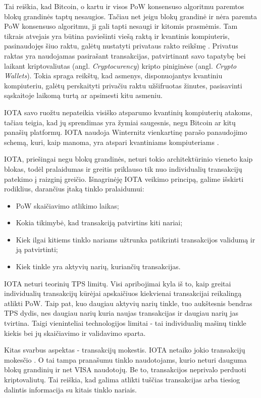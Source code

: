 Tai reiškia, kad Bitcoin, o kartu ir visos PoW konsensuso algoritmu paremtos blokų grandinės taptų nesaugios. Tačiau net jeigu blokų grandinė ir nėra paremta PoW konsensuso algoritmu, ji gali tapti nesaugi ir kitomis prasmėmis. Tam tikrais atvejais yra būtina paviešinti viešą raktą ir kvantinis kompiuteris, pasinaudojęs šiuo raktu, galėtų nustatyti privataus rakto reikšmę \cite{aggarwal2017quantum}. Privatus raktas yra naudojamas pasirašant transakcijas, patvirtinant savo tapatybę bei laikant kriptovaliutas (angl. \textit{Cryptocurency}) kripto piniginėse (angl. \textit{Crypto Wallets}). Tokia spraga reikštų, kad asmenys, disponuojantys kvantiniu kompiuteriu, galėtų perskaityti privačiu raktu užšifruotas žinutes, pasisavinti sąskaitoje laikomą turtą ar apsimesti kitu asmeniu.

IOTA savo ruožtu nepateikia visiško atsparumo kvantinių kompiuterių atakoms, tačiau teigia, kad jų sprendimas yra žymiai saugesnis, negu Bitcoin ar kitų panašių platformų. IOTA naudoja Winternitz vienkartinę parašo panaudojimo schemą, kuri, kaip manoma, yra atspari kvantiniams kompiuteriams \cite{el2018review}.

IOTA, priešingai negu blokų grandinės, neturi tokio architektūrinio vieneto kaip blokas, todėl pralaidumas ir greitis priklauso tik nuo individualių transakcijų patekimo į raizginį greičio. Išnagrinėję IOTA veikimo principą, galime išskirti rodiklius, darančius įtaką tinklo pralaidumui:
\begin{itemize}
    \item PoW skaičiavimo atlikimo laikas;
    \item Kokia tikimybė, kad transakciją patvirtins kiti nariai;
    \item Kiek ilgai kitiems tinklo nariams užtrunka patikrinti transakcijos validumą ir ją patvirtinti;
    \item Kiek tinkle yra aktyvių narių, kuriančių transakcijas.
\end{itemize}

IOTA neturi teorinių TPS limitų. Visi apribojimai kyla iš to, kaip greitai individualių transakcijų kūrėjai apskaičiuos kiekvienai transakcijai reikalingą atlikti PoW. Taip pat, kuo daugiau aktyvių narių tinkle, tuo aukštesnis bendras TPS dydis, nes daugiau narių kuria naujas transakcijas ir daugiau narių jas tvirtina. Taigi vieninteliai technologijos limitai - tai individualių mašinų tinkle kiekis bei jų skaičiavimo ir validavimo sparta.

Kitas svarbus aspektas - transakcijų mokestis. IOTA netaiko jokio transakcijų mokesčio \cite{zivic2019distributed}. O tai tampa pranašumu tinklo naudotojams, kurio neturi dauguma blokų grandinių ir net VISA naudotojų. Be to, transakcijos neprivalo perduoti kriptovaliutų. Tai reiškia, kad galima atlikti tuščias transakcijas arba tiesiog dalintis informacija su kitais tinklo nariais.

